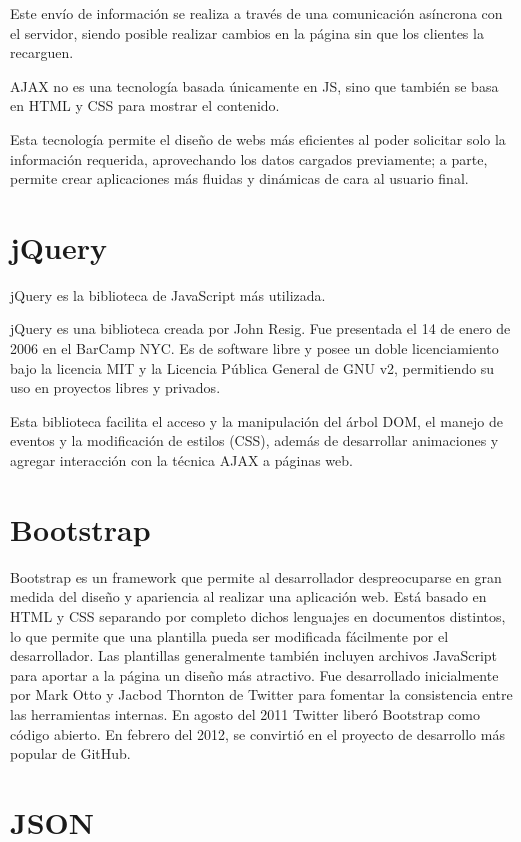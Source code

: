 Este envío de información se realiza a través de una comunicación asíncrona con el servidor, siendo posible realizar cambios en la página sin que los clientes la recarguen.


AJAX no es una tecnología basada únicamente en JS, sino que también se basa en HTML y CSS para mostrar el contenido.


Esta tecnología permite el diseño de webs más eficientes al poder solicitar solo la información requerida, aprovechando los datos cargados previamente; a parte, permite crear aplicaciones más fluidas y dinámicas de cara al usuario final.

\section{jQuery} 
\label{sec:jquery}

jQuery es la biblioteca de JavaScript más utilizada. 


jQuery es una biblioteca creada por John Resig. Fue presentada el 14 de enero de 2006 en el BarCamp NYC. Es de software libre y posee un doble licenciamiento bajo la licencia MIT y la Licencia Pública General de GNU v2, permitiendo su uso en proyectos libres y privados.


Esta biblioteca facilita el acceso y la manipulación del árbol DOM, el manejo de eventos y la modificación de estilos (CSS), además de desarrollar animaciones y agregar interacción con la técnica AJAX a páginas web.


\section{Bootstrap} 
\label{sec:bootstrap}


Bootstrap es un framework que permite al desarrollador despreocuparse en gran medida del diseño y apariencia al realizar una aplicación web. Está basado en HTML y CSS separando por completo dichos lenguajes en documentos distintos, lo que permite que una plantilla pueda ser modificada fácilmente por el desarrollador. Las plantillas generalmente también incluyen archivos JavaScript para aportar a la página un diseño más atractivo.
Fue desarrollado inicialmente por Mark Otto y Jacbod Thornton de Twitter para fomentar la consistencia entre las herramientas internas.  En agosto del 2011 Twitter liberó Bootstrap como código abierto. En febrero del 2012, se convirtió en el proyecto de desarrollo más popular de GitHub.


\section{JSON} 
\label{sec:json}



